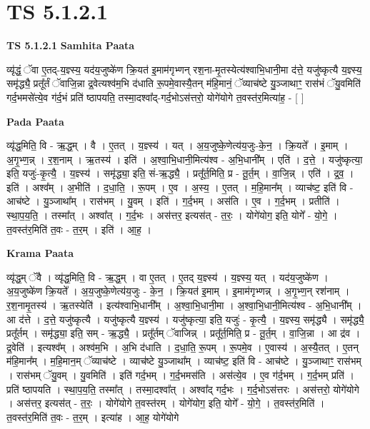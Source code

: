 \documentclass[17pt]{extarticle}
\begin{document}
\section{ TS 5.1.2.1 }

\textbf{TS 5.1.2.1 } \newline
\textbf{Samhita Paata} \newline

व्यृ॑द्धं॒ ॅवा ए॒तद्-य॒ज्ञ्स्य॒ यद॑य॒जुष्के॑ण क्रि॒यत॑ इ॒माम॑गृभ्णन् रश॒ना-मृ॒तस्येत्य॑श्वाभि॒धानी॒मा द॑त्ते॒ यजु॑ष्कृत्यै य॒ज्ञ्स्य॒ समृ॑द्ध्यै॒ प्रतू᳚र्तं ॅवाजि॒न्ना द्र॒वेत्यश्व॑म॒भि द॑धाति रू॒पमे॒वास्यै॒तन् म॑हि॒मानं॒ ॅव्याच॑ष्टे यु॒ञ्जाथाꣳ॒॒ रास॑भं ॅयु॒वमिति॑ गर्द॒भमसे॑त्ये॒व ग॑र्द॒भं प्रति॑ ष्ठापयति॒ तस्मा॒दश्वा᳚द्-गर्द॒भोऽस॑त्तरो॒ योगे॑योगे त॒वस्त॑र॒मित्या॑ह॒ - [  ] \newline

\textbf{Pada Paata} \newline

व्यृ॑द्ध॒मिति॒ वि - ऋ॒द्ध॒म् । वै । ए॒तत् । य॒ज्ञ्स्य॑ । यत् । अ॒य॒जुष्के॒णेत्य॑य॒जुः-के॒न॒ । क्रि॒यते᳚ । इ॒माम् । अ॒गृ॒भ्ण॒न्न् । र॒श॒नाम् । ऋ॒तस्य॑ । इति॑ । अ॒श्वा॒भि॒धानी॒मित्य॑श्व - अ॒भि॒धानी᳚म् । एति॑ । द॒त्ते॒ । यजु॑ष्कृत्या॒ इति॒ यजुः॑-कृ॒त्यै॒ । य॒ज्ञ्स्य॑ । समृ॑द्ध्या॒ इति॒ सं-ऋ॒द्ध्यै॒ । प्रतू᳚र्त॒मिति॒ प्र - तू॒र्त॒म् । वा॒जि॒न्न् । एति॑ । द्र॒व॒ । इति॑ । अश्व᳚म् । अ॒भीति॑ । द॒धा॒ति॒ । रू॒पम् । ए॒व । अ॒स्य॒ । ए॒तत् । म॒हि॒मान᳚म् । व्याच॑ष्ट॒ इति॑ वि - आच॑ष्टे । यु॒ञ्जाथा᳚म् । रास॑भम् । यु॒वम् । इति॑ । ग॒र्द॒भम् । अस॑ति । ए॒व । ग॒र्द॒भम् । प्रतीति॑ । स्था॒प॒य॒ति॒ । तस्मा᳚त् । अश्वा᳚त् । ग॒र्द॒भः । अस॑त्तर॒ इत्यस॑त् - त॒रः॒ । योगे॑योग॒ इति॒ योगे᳚ - यो॒गे॒ । त॒वस्त॑र॒मिति॑ त॒वः - त॒र॒म् । इति॑ । आ॒ह॒ ।  \newline


\textbf{Krama Paata} \newline

व्यृ॑द्ध॒म् ॅवै । व्यृ॑द्ध॒मिति॒ वि - ऋ॒द्ध॒म् । वा ए॒तत् । ए॒तद् य॒ज्ञ्स्य॑ । य॒ज्ञ्स्य॒ यत् । यद॑य॒जुष्के॑ण । अ॒य॒जुष्के॑ण क्रि॒यते᳚ । अ॒य॒जुष्के॒णेत्य॑य॒जुः - के॒न॒ । क्रि॒यत॑ इ॒माम् । इ॒माम॑गृभ्णन्न् । अ॒गृ॒भ्ण॒न् रश॑नाम् । र॒श॒नामृ॒तस्य॑ । ऋ॒तस्येति॑ । इत्य॑श्वाभि॒धानी᳚म् । अ॒श्वा॒भि॒धानी॒मा । अ॒श्वा॒भि॒धानी॒मित्य॑श्व - अ॒भि॒धानी᳚म् । आ द॑त्ते । द॒त्ते॒ यजु॑ष्कृत्यै । यजु॑ष्कृत्यै य॒ज्ञ्स्य॑ । यजु॑ष्कृत्या॒ इति॒ यजुः॑ - कृ॒त्यै॒ । य॒ज्ञ्स्य॒ समृ॑द्ध्यै । समृ॑द्ध्यै॒ प्रतू᳚र्तम् । समृ॑द्ध्या॒ इति॒ सम् - ऋ॒द्ध्यै॒ । प्रतू᳚र्तम् ॅवाजिन्न् । प्रतू᳚र्त॒मिति॒ प्र - तू॒र्त॒म् । वा॒जि॒न्ना । आ द्र॑व । द्र॒वेति॑ । इत्यश्व᳚म् । अश्व॑म॒भि । अ॒भि द॑धाति । द॒धा॒ति॒ रू॒पम् । रू॒पमे॒व । ए॒वास्य॑ । अ॒स्यै॒तत् । ए॒तन् म॑हि॒मान᳚म् । म॒हि॒मान॒म् ॅव्याच॑ष्टे । व्याच॑ष्टे यु॒ञ्जाथा᳚म् । व्याच॑ष्ट॒ इति॑ वि - आच॑ष्टे । यु॒ञ्जाथाꣳ॒॒ रास॑भम् । रास॑भम् ॅयु॒वम् । यु॒वमिति॑ । इति॑ गर्द॒भम् । ग॒र्द॒भमस॑ति । अस॑त्ये॒व । ए॒व ग॑र्द॒भम् । ग॒र्द॒भम् प्रति॑ । प्रति॑ ष्ठापयति । स्था॒प॒य॒ति॒ तस्मा᳚त् । तस्मा॒दश्वा᳚त् । अश्वा᳚द् गर्द॒भः । ग॒र्द॒भोऽस॑त्तरः । अस॑त्तरो॒ योगे॑योगे । अस॑त्तर॒ इत्यस॑त् - त॒रः॒ । योगे॑योगे त॒वस्त॑रम् । योगे॑योग॒ इति॒ योगे᳚ - यो॒गे॒ । त॒वस्त॑र॒मिति॑ । त॒वस्त॑र॒मिति॑ त॒वः - त॒र॒म् । इत्या॑ह । आ॒ह॒ योगे॑योगे \newline
\end{document}
